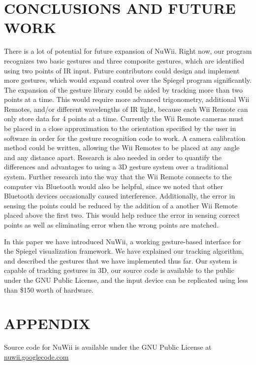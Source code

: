 \documentclass[a4paper,twoside]{article}
\begin{document}
\section{\uppercase{Conclusions and Future Work}}
There is a lot of potential for future expansion of NuWii. Right now, our program recognizes two basic gestures and three composite gestures, which are identified using two points of IR input. Future contributors could design and implement more gestures, which would expand control over the Spiegel program significantly. The expansion of the gesture library could be aided by tracking more than two points at a time. This would require more advanced trigonometry, additional Wii Remotes, and/or different wavelengths of IR light, because each Wii Remote can only store data for 4 points at a time.  Currently the Wii Remote cameras must be placed in a close approximation to the orientation specified by the user in software in order for the gesture recognition code to work. A camera calibration method could be written, allowing the Wii Remotes to be placed at any angle and any distance apart. Research is also needed in order to quantify the differences and advantages to using a 3D gesture system over a traditional system. Further research into the way that the Wii Remote connects to the computer via Bluetooth would also be helpful, since we noted that other Bluetooth devices occasionally caused interference.  Additionally, the error in sensing the points could be reduced by the addition of a another Wii Remote placed above the first two. This would help reduce the error in sensing correct points as well as eliminating error when the wrong points are matched.

    In this paper we have introduced NuWii, a working gesture-based interface for the Spiegel visualization framework. We have explained our tracking algorithm, and described the gestures that we have implemented thus far. Our system is capable of tracking gestures in 3D, our source code is available to the public under the GNU Public License, and the input device can be replicated using less than \$150 worth of hardware. 
    

\renewcommand{\baselinestretch}{0.98}

{\small
}
\renewcommand{\baselinestretch}{1}

\section*{\uppercase{Appendix}}
Source code for NuWii is available under the GNU Public License at
\url{nuwii.googlecode.com} 
\end{document}
